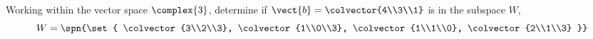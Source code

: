 Working within the vector space $\complex{3}$, determine if 
$\vect{b} = \colvector{4\\3\\1}$ is in the subspace $W$,
\begin{equation*}
W =
\spn{\set{
\colvector{3\\2\\3}, 
\colvector{1\\0\\3}, 
\colvector{1\\1\\0}, 
\colvector{2\\1\\3}
}}
\end{equation*}